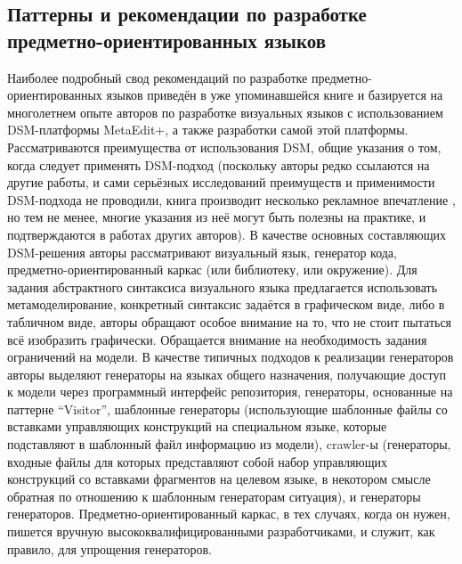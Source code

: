 \subsection{Паттерны и рекомендации по разработке предметно-ориентированных языков}
Наиболее подробный свод рекомендаций по разработке предметно-ориентированных языков 
приведён в уже упоминавшейся книге \cite{kelly2008domain} и базируется на многолетнем 
опыте авторов по разработке визуальных языков с использованием DSM-платформы MetaEdit+, 
а также разработки самой этой платформы. Рассматриваются преимущества от использования 
DSM, общие указания о том, когда следует применять DSM-подход (поскольку авторы редко 
ссылаются на другие работы, и сами серьёзных исследований преимуществ и применимости 
DSM-подхода не проводили, книга производит несколько рекламное впечатление
, но тем не менее, многие указания из неё могут быть полезны на практике, и подтверждаются в работах других 
авторов). В качестве основных составляющих DSM-решения авторы рассматривают визуальный 
язык, генератор кода, предметно-ориентированный каркас (или библиотеку, или окружение). 
Для задания абстрактного синтаксиса визуального языка предлагается использовать метамоделирование, 
конкретный синтаксис задаётся в графическом виде, либо в табличном виде, авторы обращают особое 
внимание на то, что не стоит пытаться всё изобразить графически. Обращается внимание 
на необходимость задания ограничений на модели. В качестве типичных подходов к реализации 
генераторов авторы выделяют генераторы на языках общего назначения, получающие доступ 
к модели через программный интерфейс репозитория, генераторы, основанные на паттерне "`Visitor"', 
шаблонные генераторы (использующие шаблонные файлы со вставками управляющих конструкций на специальном языке, которые 
подставляют в шаблонный файл информацию из модели), crawler-ы (генераторы, входные файлы для которых представляют собой набор 
управляющих конструкций со вставками фрагментов на целевом языке, в некотором смысле 
обратная по отношению к шаблонным генераторам ситуация), и генераторы генераторов. 
Предметно-ориентированный каркас, в тех случаях, когда он нужен, пишется вручную высококвалифицированными 
разработчиками, и служит, как правило, для упрощения генераторов.

